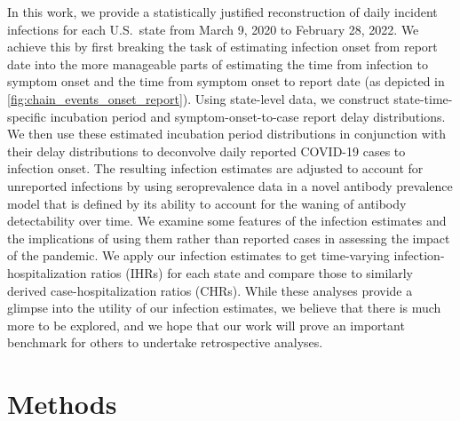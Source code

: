 \documentclass{article}
\begin{document}
In this work, we provide a statistically justified reconstruction of
daily incident infections for each U.S.\ state from March 9, 2020 to February 28, 2022.
We achieve this by first breaking the task of estimating infection onset
from report date into the more manageable parts of estimating the time from
infection to symptom onset and the time from symptom onset to report date (as
depicted in \autoref{fig:chain_events_onset_report}). Using state-level data, we
construct state-time-specific incubation period and
symptom-onset-to-case report delay distributions. We then use these estimated
incubation period distributions in conjunction with their delay distributions to
deconvolve daily reported COVID-19 cases to infection onset. The resulting
infection estimates are adjusted to account for unreported infections by
using seroprevalence data in a novel antibody prevalence model that is defined by its
ability to account for the waning of antibody detectability over time.  
We examine some features of the infection estimates and the implications of
using them rather than reported cases in assessing the impact of the pandemic.
We apply our infection estimates to get time-varying infection-hospitalization
ratios (IHRs) for each state and compare those to similarly derived
case-hospitalization ratios (CHRs).
While these analyses provide a glimpse into the utility of our
infection estimates, we believe that there is much more to be explored, and we hope that
our work will prove an important benchmark for others to undertake retrospective
analyses.

\section{Methods}
\end{document}

